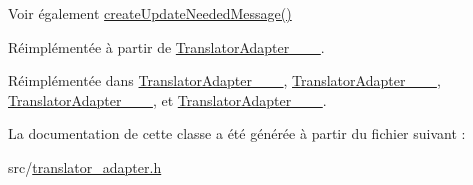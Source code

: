 \begin{DoxySeeAlso}{Voir également}
\hyperlink{class_translator_adapter_base_a71493b87a34d6e4c232e540734aba698}{create\+Update\+Needed\+Message()} 
\end{DoxySeeAlso}


Réimplémentée à partir de \hyperlink{class_translator_adapter__1__8__0_a47cedb130d9a178d9c632584d4f2abec}{Translator\+Adapter\+\_\+\_\+\_}.



Réimplémentée dans \hyperlink{class_translator_adapter__1__4__6_ab19b01d4e00c95ef1e6eb631fbe6ada4}{Translator\+Adapter\+\_\+\_\+\_}, \hyperlink{class_translator_adapter__1__5__4_a587a31dad925e47f206b6a0cda9eedd0}{Translator\+Adapter\+\_\+\_\+\_}, \hyperlink{class_translator_adapter__1__6__0_abc231eb2c1864ca9f878e7e5deb94f54}{Translator\+Adapter\+\_\+\_\+\_}, et \hyperlink{class_translator_adapter__1__6__3_ab3d79abfb926c41bd7609eeb706654fe}{Translator\+Adapter\+\_\+\_\+\_}.



La documentation de cette classe a été générée à partir du fichier suivant \+:\begin{DoxyCompactItemize}
\item 
src/\hyperlink{translator__adapter_8h}{translator\+\_\+adapter.\+h}\end{DoxyCompactItemize}
